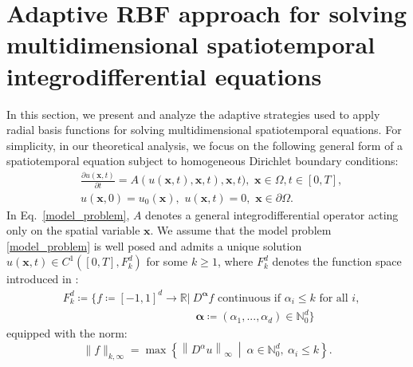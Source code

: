 \documentclass[10pt,a4paper]{amsart}
\begin{document}
\section{Adaptive RBF approach for solving multidimensional spatiotemporal integrodifferential equations}
\label{section2}
In this section, we present and analyze the adaptive strategies used to apply radial basis functions for solving multidimensional spatiotemporal equations. For simplicity, in our theoretical analysis, we focus on the following general form of a spatiotemporal equation subject to homogeneous Dirichlet boundary conditions:
\begin{equation}
\begin{aligned}
    &\frac{\partial u(\bm{x}, t)}{\partial t} = A(u(\bm{x}, t), \bm{x}, t), \bm{x}, t), \,\,\bm{x}\in\Omega, t\in[0, T],\\
    & u(\bm{x}, 0) = u_0(\bm{x}), \,\, u(\bm{x}, t) = 0, \,\,\bm{x}\in\partial\Omega.
    \end{aligned}
    \label{model_problem}
\end{equation}
In Eq.~\eqref{model_problem}, $A$ denotes a general integrodifferential operator acting only on the spatial variable $\bm{x}$. We assume that the model problem \eqref{model_problem} is well posed and admits a unique solution $u(\bm{x},t)\in C^1([0,T],F_k^d)$ for some $k\ge 1$, where $F_k^d$ denotes the function space introduced in \cite{barthelmann2000high}:
\begin{equation}
\begin{aligned}
&F_k^d \coloneqq  \Big\{ f \coloneqq [-1, 1]^d \to \mathbb{R}  \big|\ D^{\bm{\alpha}}f \text{ continuous if } \alpha_i \leq k \text{ for all } i,\\
&\hspace{5cm}\bm{\alpha}\coloneqq(\alpha_1,...,\alpha_d)\in \mathbb{N}_0^d \Big\}
\end{aligned}
\end{equation}
equipped with the norm:
\begin{equation}
\|f\|_{k, \infty} = \max\left\{ \left\|D^{\alpha}u\right\|_{\infty} \ \middle|\ \alpha \in \mathbb{N}_0^d,\ \alpha_i \leq k \right\}.
\end{equation}
\end{document}
